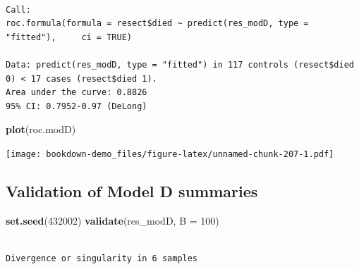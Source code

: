 \documentclass[]{book}
\newenvironment{Shaded}{\begin{snugshade}}{\end{snugshade}}
\newcommand{\KeywordTok}[1]{\textcolor[rgb]{0.13,0.29,0.53}{\textbf{#1}}}
\newcommand{\DataTypeTok}[1]{\textcolor[rgb]{0.13,0.29,0.53}{#1}}
\newcommand{\DecValTok}[1]{\textcolor[rgb]{0.00,0.00,0.81}{#1}}
\newcommand{\StringTok}[1]{\textcolor[rgb]{0.31,0.60,0.02}{#1}}
\newcommand{\OtherTok}[1]{\textcolor[rgb]{0.56,0.35,0.01}{#1}}
\newcommand{\OperatorTok}[1]{\textcolor[rgb]{0.81,0.36,0.00}{\textbf{#1}}}
\newcommand{\NormalTok}[1]{#1}
\theoremstyle{definition}
\theoremstyle{definition}
\theoremstyle{definition}
\theoremstyle{remark}
\begin{document}
\begin{Shaded}
\end{Shaded}

\begin{verbatim}

Call:
roc.formula(formula = resect$died ~ predict(res_modD, type = "fitted"),     ci = TRUE)

Data: predict(res_modD, type = "fitted") in 117 controls (resect$died 0) < 17 cases (resect$died 1).
Area under the curve: 0.8826
95% CI: 0.7952-0.97 (DeLong)
\end{verbatim}

\begin{Shaded}
\begin{Highlighting}[]
\KeywordTok{plot}\NormalTok{(roc.modD)}
\end{Highlighting}
\end{Shaded}

\texttt{[image: bookdown-demo\_files/figure-latex/unnamed-chunk-207-1.pdf]}

\subsection{Validation of Model D
summaries}\label{validation-of-model-d-summaries}

\begin{Shaded}
\begin{Highlighting}[]
\KeywordTok{set.seed}\NormalTok{(}\DecValTok{432002}\NormalTok{)}
\KeywordTok{validate}\NormalTok{(res_modD, }\DataTypeTok{B =} \DecValTok{100}\NormalTok{)}
\end{Highlighting}
\end{Shaded}

\begin{verbatim}

Divergence or singularity in 6 samples
\end{verbatim}
\end{document}
